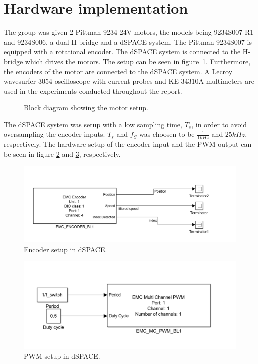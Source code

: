 \section{Hardware implementation}
The group was given 2 Pittman 9234 24V motors, the models being 9234S007-R1 and 9234S006, a dual H-bridge and a dSPACE system.
The Pittman 9234S007 is equipped with a rotational encoder.
The dSPACE system is connected to the H-bridge which drives the motors. 
The setup can be seen in figure~\ref{fig:implementation_block}.
Furthermore, the encoders of the motor are connected to the dSPACE system.
A Lecroy wavesurfer 3054 oscilloscope with current probes and KE 34310A multimeters are used in the experiments conducted throughout the report.

\begin{figure}[!h]
\centering

  \caption{Block diagram showing the motor setup.}
  \label{fig:implementation_block}
\end{figure}

The dSPACE system was setup with a low sampling time, $T_s$, in order to avoid oversampling the encoder inputs.
$T_s$ and $f_S$ was choosen to be $\frac{1}{1kHz}$ and $25kHz$, respectively. 
The hardware setup of the encoder input and the PWM output can be seen in figure \ref{fig:encoder} and \ref{fig:pwm}, respectively.


\begin{figure}[!h]
\centering
\includegraphics[scale=0.3]{graphics/encoder.png}
  \caption{Encoder setup in dSPACE.}
  \label{fig:encoder}
\end{figure}

\begin{figure}[!h]
\centering
\includegraphics[scale=0.3]{graphics/pwm.png}
  \caption{PWM setup in dSPACE.}
  \label{fig:pwm}
\end{figure}
